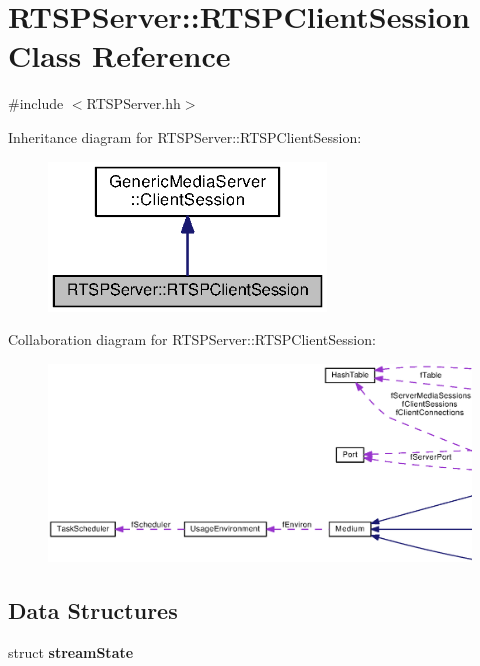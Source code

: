 \section{R\+T\+S\+P\+Server\+:\+:R\+T\+S\+P\+Client\+Session Class Reference}
\label{classRTSPServer_1_1RTSPClientSession}


{\ttfamily \#include $<$R\+T\+S\+P\+Server.\+hh$>$}



Inheritance diagram for R\+T\+S\+P\+Server\+:\+:R\+T\+S\+P\+Client\+Session\+:
\nopagebreak
\begin{figure}[H]
\begin{center}
\leavevmode
\includegraphics[width=209pt]{classRTSPServer_1_1RTSPClientSession__inherit__graph}
\end{center}
\end{figure}


Collaboration diagram for R\+T\+S\+P\+Server\+:\+:R\+T\+S\+P\+Client\+Session\+:
\nopagebreak
\begin{figure}[H]
\begin{center}
\leavevmode
\includegraphics[width=350pt]{classRTSPServer_1_1RTSPClientSession__coll__graph}
\end{center}
\end{figure}
\subsection*{Data Structures}
\begin{DoxyCompactItemize}
\item 
struct {\bf stream\+State}
\end{DoxyCompactItemize}
